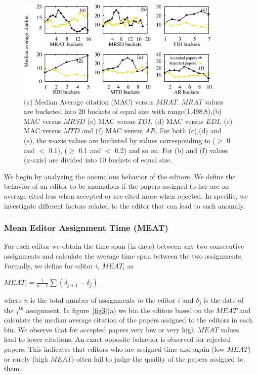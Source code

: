 \begin{figure}[!ht]
\centering
\includegraphics[width=0.9\textwidth]{./texfiles/Chapter_4/cikm/figures/reviewer_all.eps}
\caption{\label{fig5}(a) Median Average citation (MAC) versus $MRAT$. $MRAT$ values are bucketed into 20 buckets of equal size with range(1,498.8),(b) MAC versus $MRSD$ (c) MAC versus $TDI$, (d) MAC versus $EDI$, (e) MAC versus $MTD$ and (f) MAC versus $AR$. For both (c),(d) and (e), the x-axis values are bucketed by values corresponding to ($\geq$ 0 and $<$ 0.1), ($\geq$ 0.1 and $<$ 0.2) and so on. For (b) and (f) values (x-axis) are divided into 10 buckets of equal size.}
\end{figure}

We begin by analyzing the anomalous behavior of the editors. We define the behavior of an editor to be anomalous if the papers assigned to her are on average cited less when accepted or are cited more when rejected. In specific, we investigate different factors related to the editor that can lead to such anomaly.
\subsubsection{Mean Editor Assignment Time (MEAT)}
For each editor we obtain the time span (in days) between any two consecutive assignments and calculate the average time span between the two assignments. 
Formally, we define for editor $i$, $MEAT_{i}$ as
\begin{center}
$MEAT_{i}=\frac{1}{n-1}\sum (\delta_{j+1} - \delta_{j})$
\end{center}
where $n$ is the total number of assignments to the editor $i$ and $\delta_{j}$ is the date of the $j$$^\textrm{th}$ assignment. 
In figure~\ref{fig3}(a) we bin the editors based on the $MEAT$ and calculate the median average citation of the papers assigned to the editors in each bin. 
{We observe that for accepted papers very low or very high $MEAT$ values lead to lower citations. An exact opposite behavior is observed for rejected papers. 
This indicates that editors who are assigned time and again (low $MEAT$) or rarely (high $MEAT$) often fail to judge the quality of the papers assigned to them.} 

